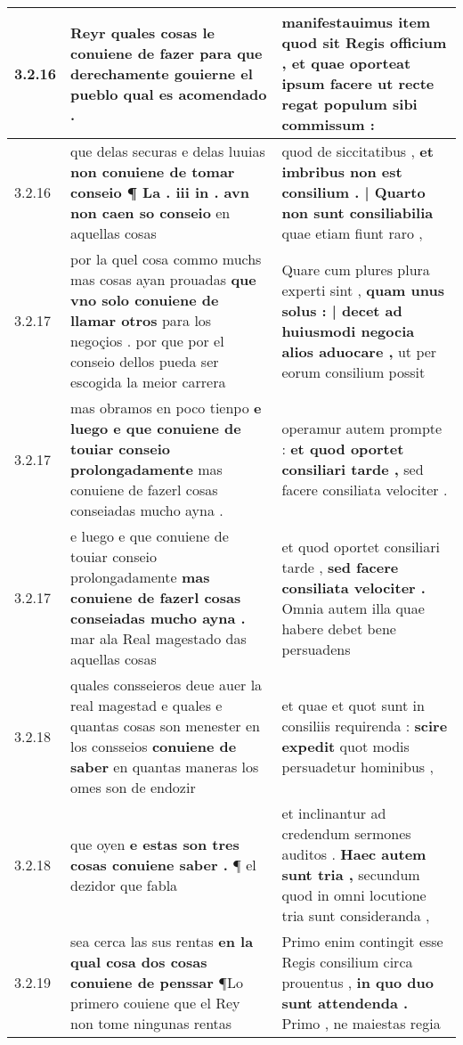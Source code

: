 \begin{tabular}{|p{1cm}|p{6.5cm}|p{6.5cm}|}
3.2.16 & Reyr \textbf{ quales cosas le conuiene de fazer } para que derechamente gouierne el pueblo qual es acomendado . & manifestauimus item quod sit Regis officium , \textbf{ et quae oporteat ipsum facere } ut recte regat populum sibi commissum : \\\hline
3.2.16 & que delas securas e delas luuias \textbf{ non conuiene de tomar conseio ¶ La . iii in . avn non caen so conseio } en aquellas cosas & quod de siccitatibus , \textbf{ et imbribus non est consilium . | Quarto non sunt consiliabilia } quae etiam fiunt raro , \\\hline
3.2.17 & por la quel cosa commo muchs mas cosas ayan prouadas \textbf{ que vno solo conuiene de llamar otros } para los negoçios . por que por el conseio dellos pueda ser escogida la meior carrera & Quare cum plures plura experti sint , \textbf{ quam unus solus : | decet ad huiusmodi negocia alios aduocare , } ut per eorum consilium possit \\\hline
3.2.17 & mas obramos en poco tienpo \textbf{ e luego e que conuiene de touiar conseio prolongadamente } mas conuiene de fazerl cosas conseiadas mucho ayna . & operamur autem prompte : \textbf{ et quod oportet consiliari tarde , } sed facere consiliata velociter . \\\hline
3.2.17 & e luego e que conuiene de touiar conseio prolongadamente \textbf{ mas conuiene de fazerl cosas conseiadas mucho ayna . } mar ala Real magestado das aquellas cosas & et quod oportet consiliari tarde , \textbf{ sed facere consiliata velociter . } Omnia autem illa quae habere debet bene persuadens \\\hline
3.2.18 & quales consseieros deue auer la real magestad e quales e quantas cosas son menester en los consseios \textbf{ conuiene de saber } en quantas maneras los omes son de endozir & et quae et quot sunt in consiliis requirenda : \textbf{ scire expedit } quot modis persuadetur hominibus , \\\hline
3.2.18 & que oyen \textbf{ e estas son tres cosas conuiene saber . } ¶ el dezidor que fabla & et inclinantur ad credendum sermones auditos . \textbf{ Haec autem sunt tria , } secundum quod in omni locutione tria sunt consideranda , \\\hline
3.2.19 & sea cerca las sus rentas \textbf{ en la qual cosa dos cosas conuiene de penssar } ¶Lo primero couiene que el Rey non tome ningunas rentas & Primo enim contingit esse Regis consilium circa prouentus , \textbf{ in quo duo sunt attendenda . } Primo , ne maiestas regia \\\hline

\end{tabular}
